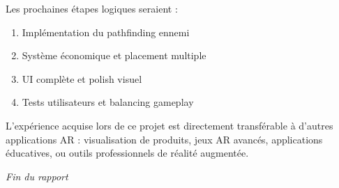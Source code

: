 \documentclass[12pt,a4paper]{article}
\begin{document}
Les prochaines étapes logiques seraient :
\begin{enumerate}
    \item Implémentation du pathfinding ennemi
    \item Système économique et placement multiple
    \item UI complète et polish visuel
    \item Tests utilisateurs et balancing gameplay
\end{enumerate}

L'expérience acquise lors de ce projet est directement transférable à d'autres applications AR : visualisation de produits, jeux AR avancés, applications éducatives, ou outils professionnels de réalité augmentée.

\vspace{1cm}

\begin{center}
\textit{Fin du rapport}
\end{center}
\end{document}

